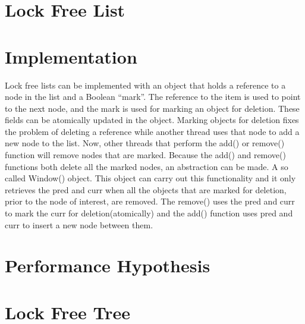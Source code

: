 \documentclass[10pt,a4paper]{article}
\begin{document}

\section{Lock Free List} \section{Implementation} Lock free lists can be
implemented with an object that holds a reference to a node in the list and a
Boolean ``mark''. The reference to the item is used to point to the next node,
and the mark is used for marking an object for deletion. These fields can be
atomically updated in the object. Marking objects for deletion fixes the
problem of deleting a reference while another thread uses that node to add a
new node to the list. Now, other threads that perform the add() or remove()
function will remove nodes that are marked. Because the add() and remove()
functions both delete all the marked nodes, an abstraction can be made. A so
called Window() object. This object can carry out this functionality and it
only retrieves the pred and curr when all the objects that are marked for deletion,
prior to the node of interest, are removed. The remove() uses the
pred and curr to mark the curr for deletion(atomically) and the add() function
uses pred and curr to insert a new node between them.

\section{Performance Hypothesis}


\section{Lock Free Tree}
\end{document}
